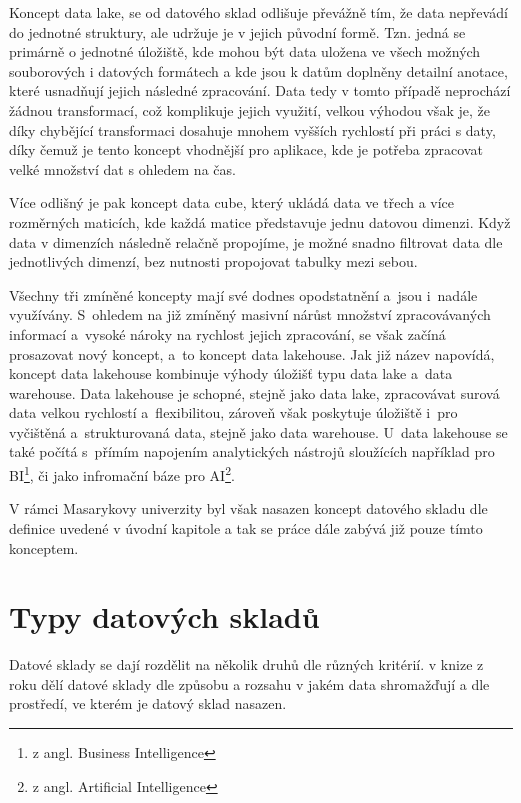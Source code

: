 \documentclass[
  digital,     %
  twoside,     %
  lof,         %
  lot,         %
]{fithesis4}
\begin{document}
Koncept data lake, se od datového sklad odlišuje převážně tím, že data
nepřevádí do jednotné struktury, ale udržuje je v jejich původní formě. Tzn. jedná se
primárně o jednotné úložiště, kde mohou být data uložena ve všech možných souborových
i datových formátech a kde jsou k datům doplněny detailní anotace, které usnadňují jejich následné zpracování.\parencite{Foote19042018}
Data tedy v tomto případě neprochází žádnou transformací, což komplikuje jejich využití, velkou výhodou však je, že  díky chybějící 
transformaci dosahuje mnohem vyšších rychlostí při práci s daty, díky čemuž je tento koncept vhodnější pro aplikace,
kde je potřeba zpracovat velké množství dat s ohledem na čas.\parencite[s.~1]{Harby20221217}

Více odlišný je pak koncept data cube, který ukládá data ve třech a více
rozměrných maticích, kde každá matice představuje jednu datovou dimenzi. Když
data v dimenzích následně relačně propojíme, je možné snadno filtrovat data dle
jednotlivých dimenzí, bez nutnosti propojovat tabulky mezi sebou.\parencite{Foote19042018}

Všechny tři zmíněné koncepty mají své dodnes opodstatnění a jsou i nadále využívány. S ohledem na již zmíněný masivní nárůst množství zpracovávaných informací a vysoké nároky na rychlost jejich zpracování, se však začíná prosazovat nový koncept, a to koncept data lakehouse. Jak již název napovídá, koncept data lakehouse kombinuje výhody úložišť typu data lake a data warehouse. Data lakehouse je schopné, stejně jako data lake, zpracovávat surová data velkou rychlostí a flexibilitou, zároveň však poskytuje úložiště i pro vyčištěná a strukturovaná data, stejně jako data warehouse. U data lakehouse se také počítá s přímím napojením analytických nástrojů sloužících například pro BI\footnote{z angl. Business Intelligence}, či jako infromační báze pro AI\footnote{z angl. Artificial Intelligence}.

V rámci Masarykovy univerzity byl však nasazen koncept datového skladu dle definice uvedené v úvodní kapitole a tak se práce dále zabývá již pouze tímto konceptem.

\section{Typy datových skladů}
Datové sklady se dají rozdělit na několik druhů dle různých kritérií. \citeauthor{Inmon2005}
v knize  z roku \citeyear{Inmon2005} dělí datové sklady dle způsobu a rozsahu
v jakém data shromažďují a dle prostředí, ve kterém je datový sklad nasazen.
\end{document}
